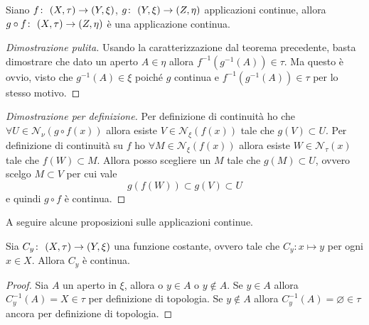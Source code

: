 \begin{theorem}
	Siano $f \colon\ (X, \tau) \rightarrow (Y, \xi)$, $g \colon\ (Y,\xi) \rightarrow (Z, \eta)$ applicazioni continue, allora $g \circ f \colon\ (X,\tau) \rightarrow (Z,\eta)$ è una applicazione continua.
\end{theorem}
\begin{proof}[Dimostrazione pulita]
	Usando la caratterizzazione dal teorema precedente, basta dimostrare che dato un aperto $A \in \eta$ allora $f^{-1}(g^{-1}(A)) \in \tau$. Ma questo è ovvio, visto che $g^{-1}(A) \in \xi$ poiché $g$ continua e $f^{-1}(g^{-1}(A)) \in \tau$ per lo stesso motivo.  
\end{proof}
\begin{proof}[Dimostrazione per definizione]
	Per definizione di continuità ho che $\forall U \in \mathcal{N}_\nu(g \circ f (x))$ allora esiste $V \in \mathcal{N}_\xi(f(x))$ tale che $g(V) \subset U$. Per definizione di continuità su $f$ ho $\forall M \in \mathcal{N}_\xi(f (x))$ allora esiste $W \in \mathcal{N}_\tau(x)$ tale che $f(W) \subset M$. Allora posso scegliere un $M$ tale che $g(M) \subset U$, ovvero scelgo $M \subset V$ per cui vale 
	\begin{equation*}
		g(f(W)) \subset g(V) \subset U
	\end{equation*}
	e quindi $g \circ f$ è continua.
\end{proof}

A seguire alcune proposizioni sulle applicazioni continue.

\begin{theorem}
	Sia $C_y \colon\ (X,\tau) \rightarrow (Y,\xi)$ una funzione costante, ovvero tale che $C_y : x \mapsto y$ per ogni $x \in X$. Allora $C_y$ è continua.
\end{theorem}
\begin{proof}
	Sia $A$ un aperto in $\xi$, allora o $y \in A$ o $y \notin A$. Se $y \in A$ allora $C^{-1}_y(A) = X \in \tau$ per definizione di topologia. Se $y \notin A$ allora $C^{-1}_y(A) = \varnothing \in \tau$ ancora per definizione di topologia.
\end{proof}

